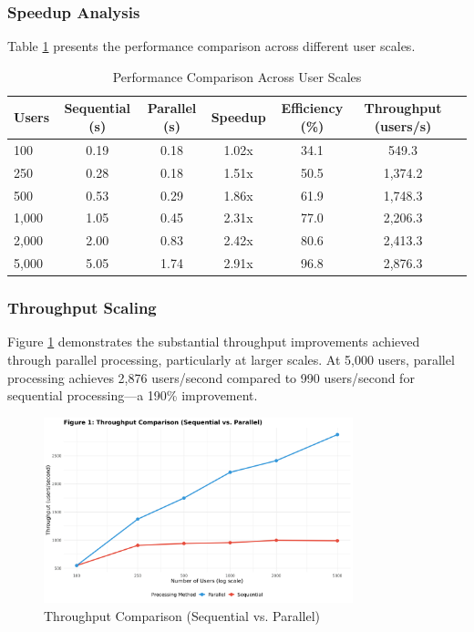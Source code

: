 \documentclass[11pt]{article}
\begin{document}
\subsubsection{Speedup Analysis}

Table \ref{tab:performance} presents the performance comparison across different user scales.

\begin{table}[H]
\centering
\caption{Performance Comparison Across User Scales}
\label{tab:performance}
\begin{tabular}{@{}lcccccc@{}}
\toprule
Users & Sequential (s) & Parallel (s) & Speedup & Efficiency (\%) & Throughput (users/s) \\
\midrule
100   & 0.19           & 0.18         & 1.02x   & 34.1           & 549.3                \\
250   & 0.28           & 0.18         & 1.51x   & 50.5           & 1,374.2              \\
500   & 0.53           & 0.29         & 1.86x   & 61.9           & 1,748.3              \\
1,000 & 1.05           & 0.45         & 2.31x   & 77.0           & 2,206.3              \\
2,000 & 2.00           & 0.83         & 2.42x   & 80.6           & 2,413.3              \\
5,000 & 5.05           & 1.74         & 2.91x   & 96.8           & 2,876.3              \\
\bottomrule
\end{tabular}
\end{table}

\subsubsection{Throughput Scaling}

Figure \ref{fig:throughput} demonstrates the substantial throughput improvements achieved through parallel processing, particularly at larger scales. At 5,000 users, parallel processing achieves 2,876 users/second compared to 990 users/second for sequential processing—a 190\% improvement.

\begin{figure}[H]
\centering
\includegraphics[width=0.8\textwidth]{Figure1_Throughput_Comparison.png}
\caption{Throughput Comparison (Sequential vs. Parallel)}
\label{fig:throughput}
\end{figure}
\end{document}
